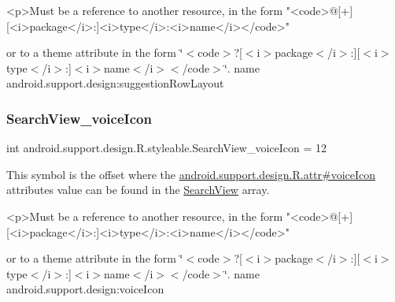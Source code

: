 \begin{DoxyVerb}      <p>Must be a reference to another resource, in the form "<code>@[+][<i>package</i>:]<i>type</i>:<i>name</i></code>"
\end{DoxyVerb}
 or to a theme attribute in the form \char`\"{}$<$code$>$?\mbox{[}$<$i$>$package$<$/i$>$\+:\mbox{]}\mbox{[}$<$i$>$type$<$/i$>$\+:\mbox{]}$<$i$>$name$<$/i$>$$<$/code$>$\char`\"{}.  name android.\+support.\+design\+:suggestion\+Row\+Layout \mbox{\label{classandroid_1_1support_1_1design_1_1R_1_1styleable_ab8427471179b0f69c665ef59d850bd39}} 
\subsubsection{\texorpdfstring{Search\+View\+\_\+voice\+Icon}{SearchView\_voiceIcon}}
{\footnotesize\ttfamily int android.\+support.\+design.\+R.\+styleable.\+Search\+View\+\_\+voice\+Icon = 12\hspace{0.3cm}{\ttfamily [static]}}

This symbol is the offset where the \hyperlink{classandroid_1_1support_1_1design_1_1R_1_1attr_a52019590c44e770bbcf3702f5e7af367}{android.\+support.\+design.\+R.\+attr\#voice\+Icon} attribute\textquotesingle{}s value can be found in the \hyperlink{classandroid_1_1support_1_1design_1_1R_1_1styleable_a8f7e72dc1bf854e14c1be7dbc1cb7392}{Search\+View} array.

\begin{DoxyVerb}      <p>Must be a reference to another resource, in the form "<code>@[+][<i>package</i>:]<i>type</i>:<i>name</i></code>"
\end{DoxyVerb}
 or to a theme attribute in the form \char`\"{}$<$code$>$?\mbox{[}$<$i$>$package$<$/i$>$\+:\mbox{]}\mbox{[}$<$i$>$type$<$/i$>$\+:\mbox{]}$<$i$>$name$<$/i$>$$<$/code$>$\char`\"{}.  name android.\+support.\+design\+:voice\+Icon \mbox{\label{classandroid_1_1support_1_1design_1_1R_1_1styleable_ade77d86fa8e689770b5436467abdc2db}} 
